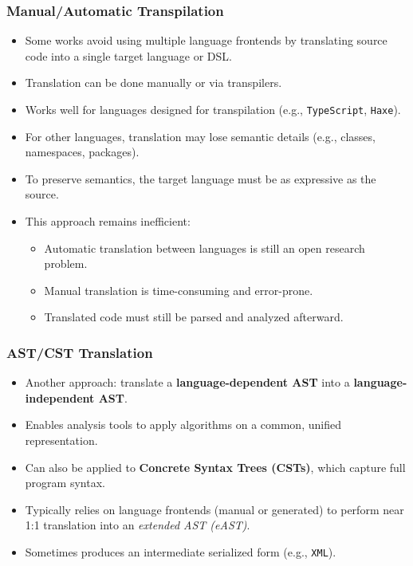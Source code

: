 \documentclass[dvipsnames, 10pt]{beamer}
\begin{document}
\begin{frame}
  \frametitle{Manual/Automatic Transpilation}
  \begin{itemize}
      \item Some works avoid using multiple language frontends by translating source code into a single target language or DSL.
      \item Translation can be done manually or via transpilers.
      \item Works well for languages designed for transpilation (e.g., \texttt{TypeScript}, \texttt{Haxe}).
      \item For other languages, translation may lose semantic details (e.g., classes, namespaces, packages).
      \item To preserve semantics, the target language must be as expressive as the source.
      \item This approach remains inefficient:
      \begin{itemize}
          \item Automatic translation between languages is still an open research problem.
          \item Manual translation is time-consuming and error-prone.
          \item Translated code must still be parsed and analyzed afterward.
      \end{itemize}
  \end{itemize}
\end{frame}

\begin{frame}
  \frametitle{AST/CST Translation}
  \begin{itemize}
      \item Another approach: translate a \textbf{language-dependent AST} into a \textbf{language-independent AST}.
      \item Enables analysis tools to apply algorithms on a common, unified representation.
      \item Can also be applied to \textbf{Concrete Syntax Trees (CSTs)}, which capture full program syntax.
      \item Typically relies on language frontends (manual or generated) to perform near 1:1 translation into an \textit{extended AST (eAST)}.
      \item Sometimes produces an intermediate serialized form (e.g., \texttt{XML}).
  \end{itemize}
\end{frame}
\end{document}
